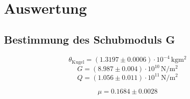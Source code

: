 \section{Auswertung}
\label{sec:Auswertung}
\subsection{Bestimmung des Schubmoduls G}
\begin{equation}
	\theta_{\mathrm{Kugel}}=(1.3197\pm 0.0006) \cdot 10^{-4} \,\si{\kilo\gram \square\metre}
\end{equation}
\begin{equation}
	G= (8.987\pm 0.004) \cdot 10^{10}  \,\si{\newton \per \square\metre}
\end{equation}
\begin{equation}
	Q= (1.056\pm 0.011) \cdot 10^{11}  \,\si{\newton \per \square\metre}
\end{equation}

\begin{equation}
	\mu= 0.1684\pm 0.0028
\end{equation}
